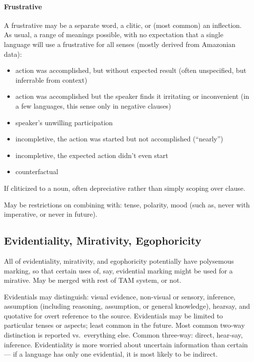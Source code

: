\documentclass[11pt]{article}
\newenvironment{grammarlist}%
 {\begin{itemize}\addtolength{\itemsep}{-0.5\baselineskip}\ignorespaces}%
 {\end{itemize}\ignorespacesafterend}
\begin{document}
{%


\paragraph{Frustrative}
A frustrative may be a separate word, a clitic, or (most common) an
inflection.  As usual, a range of meanings possible, with no
expectation that a single language will use a frustrative for all
senses (mostly derived from Amazonian data):

\begin{grammarlist}
  \item action was accomplished, but without expected result (often
    unspecified, but inferrable from context)
  \item action was accomplished but the speaker finds it irritating or
    inconvenient (in a few languages, this sense only in negative clauses)
  \item speaker's unwilling participation
  \item incompletive, the action was started but not accomplished
    (``nearly'') 
  \item incompletive, the expected action didn't even start
  \item counterfactual
\end{grammarlist}

If cliticized to a noun, often depreciative rather than simply scoping
over clause.

May be restrictions on combining with: tense, polarity, mood (such as,
never with imperative, or never in future).


\subsection{Evidentiality, Mirativity, Egophoricity}
All of evidentiality, mirativity, and egophoricity potentially have
polysemous marking, so that certain uses of, say, evidential marking
might be used for a mirative.  May be merged with rest of TAM system,
or not.

Evidentials may distinguish: visual evidence, non-visual or sensory,
inference, assumption (including reasoning, assumption, or general
knowledge), hearsay, and quotative for overt reference to the source.
Evidentials may be limited to particular tenses or aspects; least
common in the future.  Most common two-way distinction is reported
vs.\ everything else.  Common three-way: direct, hear-say, inference.
Evidentiality is more worried about uncertain information than certain
— if a language has only one evidential, it is most likely to be
indirect. 

}
\end{document}
